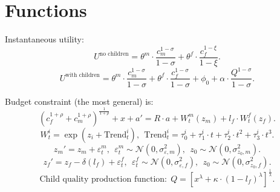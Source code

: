 \documentclass[12pt,letter]{article}
\begin{document}




\section{Functions}

Instantaneous utility:
\[U^{\text{no children}} = \theta^m \cdot \frac{c_m^{1-\sigma}}{1-\sigma} + \theta^f \cdot \frac{c_f^{1-\xi}}{1-\xi}.\]
\[U^{\text{with children}} = \theta^m \cdot \frac{c_m^{1-\sigma}}{1-\sigma} + \theta^f \cdot \frac{c_f^{1-\sigma}}{1-\sigma} + \phi_0 + \alpha\cdot \frac{Q^{1-\sigma}}{1-\sigma}.\]

Budget constraint (the most general) is:
\[(c_f^{1+\rho} + c_m^{1+\rho})^{\frac1{1+\rho}} + x + a' = R\cdot a + W^m_t(z_m) + l_f\cdot W^f_t(z_f).\]
\[W^i_t = \exp( z_i + \text{Trend}^i_t), \ \ \text{Trend}^i_t = \tau^i_0 + \tau^i_1 \cdot t + \tau^i_2 \cdot t^2 + \tau^i_3 \cdot t^3.\]
\[z_m' = z_m + \varepsilon^m_t, \ \ \varepsilon^m_t \sim \mathcal{N}(0,\sigma^{2}_{\varepsilon,m}), \ \ z_0 \sim \mathcal{N}(0,\sigma^{2}_{z_0,m}).\]
\[z_f' = z_f - \delta(l_f) + \varepsilon^f_t, \ \ \varepsilon^f_t \sim \mathcal{N}(0,\sigma^{2}_{\varepsilon,f}), \ \ z_0 \sim \mathcal{N}(0,\sigma^{2}_{z_0,f}).\]
\[\text{Child quality production function:} \ \ Q = \left[ x^{\lambda}  + \kappa \cdot (1-l_f)^{\lambda}\right]^{\frac1{\lambda}}.\]
\newpage
\end{document}
